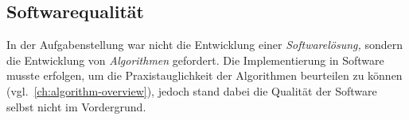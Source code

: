 \documentclass[../main/thesis.tex]{subfiles}
\begin{document}



\subsection{Softwarequalität}

In der Aufgabenstellung war nicht die Entwicklung einer \emph{Softwarelösung,} sondern die Entwicklung von \emph{Algorithmen} gefordert.
Die Implementierung in Software musste erfolgen, um die Praxistauglichkeit der Algorithmen beurteilen zu können (vgl.~\ref{ch:algorithm-overview}), jedoch stand dabei die Qualität der Software selbst nicht im Vordergrund.
\end{document}
